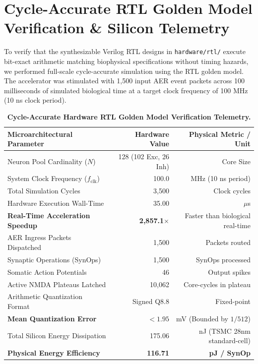 \documentclass[11pt,letterpaper]{report}
\begin{document}
\section{Cycle-Accurate RTL Golden Model Verification \& Silicon Telemetry}
To verify that the synthesizable Verilog RTL designs in \texttt{hardware/rtl/} execute bit-exact arithmetic matching biophysical specifications without timing hazards, we performed full-scale cycle-accurate simulation using the RTL golden model. The accelerator was stimulated with 1,500 input AER event packets across 100 milliseconds of simulated biological time at a target clock frequency of 100 MHz (10 ns clock period).

\begin{table}[h]
\centering
\small
\caption{\textbf{Cycle-Accurate Hardware RTL Golden Model Verification Telemetry.}}
\label{tab:rtl_telemetry}
\begin{tabular}{lrr}
\toprule
\textbf{Microarchitectural Parameter} & \textbf{Hardware Value} & \textbf{Physical Metric / Unit} \\
\midrule
Neuron Pool Cardinality ($N$) & 128 (102 Exc, 26 Inh) & Core Size \\
System Clock Frequency ($f_{\mathrm{clk}}$) & 100.0 & MHz (10 ns period) \\
Total Simulation Cycles & 3,500 & Clock cycles \\
Hardware Execution Wall-Time & 35.00 & $\mu$s \\
\textbf{Real-Time Acceleration Speedup} & \textbf{2,857.1$\times$} & Faster than biological real-time \\
AER Ingress Packets Dispatched & 1,500 & Packets routed \\
Synaptic Operations (SynOps) & 1,500 & SynOps processed \\
Somatic Action Potentials & 46 & Output spikes \\
Active NMDA Plateaus Latched & 10,062 & Core-cycles in plateau \\
Arithmetic Quantization Format & Signed Q8.8 & Fixed-point \\
\textbf{Mean Quantization Error} & \textbf{$< 1.95$} & mV (Bounded by $1/512$) \\
Total Silicon Energy Dissipation & 175.06 & nJ (TSMC 28nm standard-cell) \\
\textbf{Physical Energy Efficiency} & \textbf{116.71} & \textbf{pJ / SynOp} \\
\bottomrule
\end{tabular}
\end{table}
\end{document}
